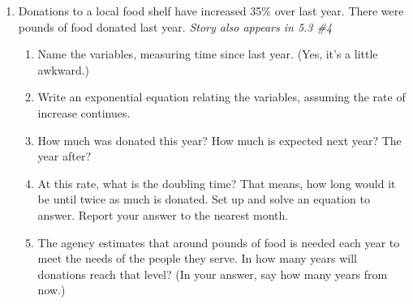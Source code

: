\begin{enumerate}
\item Donations to a local food shelf have increased 35\% over last year.  There were  pounds of food donated last year. \hfill \emph{Story also appears in 5.3 \#4}
\begin{enumerate}
\item Name the variables, measuring time since last year.  (Yes, it's a little awkward.)
\item Write an exponential equation relating the variables, assuming the rate of increase continues.
\item How much was donated this year?  How much is expected next year?  The year after?
\item At this rate, what is the doubling time?  That means, how long would it be until twice as much is donated.  Set up and solve an equation to answer.  Report your answer to the nearest month.
\item The agency estimates that around  pounds of food is needed each year to meet the needs of the people they serve.  In how many years will donations reach that level?  (In your answer, say how many years from now.)
\end{enumerate}


\end{enumerate}